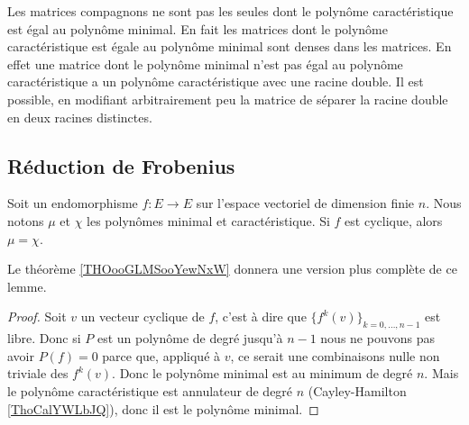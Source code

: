\begin{remark}  \label{RemmQjZOA}
    Les matrices compagnons ne sont pas les seules dont le polynôme caractéristique est égal au polynôme minimal. En fait les matrices dont le polynôme caractéristique est égale au polynôme minimal sont denses dans les matrices. En effet une matrice dont le polynôme minimal n'est pas égal au polynôme caractéristique a un polynôme caractéristique avec une racine double. Il est possible, en modifiant arbitrairement peu la matrice de séparer la racine double en deux racines distinctes.
\end{remark}

\subsection{Réduction de Frobenius}

\begin{lemma}       \label{LEMooKUQDooKFeIYq}
    Soit un endomorphisme \( f\colon E\to E\) sur l'espace vectoriel de dimension finie \( n\). Nous notons \( \mu\) et \( \chi\) les polynômes minimal et caractéristique. Si \( f\) est cyclique, alors \( \mu=\chi\).
\end{lemma}
Le théorème \ref{THOooGLMSooYewNxW} donnera une version plus complète de ce lemme.

\begin{proof}
    Soit \( v\) un vecteur cyclique de \( f\), c'est à dire que \( \{ f^k(v) \}_{k=0,\ldots, n-1}\) est libre. Donc si \( P\) est un polynôme de degré jusqu'à \( n-1\) nous ne pouvons pas avoir \( P(f)=0\) parce que, appliqué à \( v\), ce serait une combinaisons nulle non triviale des \( f^k(v)\). Donc le polynôme minimal est au minimum de degré \( n\). Mais le polynôme caractéristique est annulateur de degré \( n\) (Cayley-Hamilton \ref{ThoCalYWLbJQ}), donc il est le polynôme minimal.
\end{proof}

